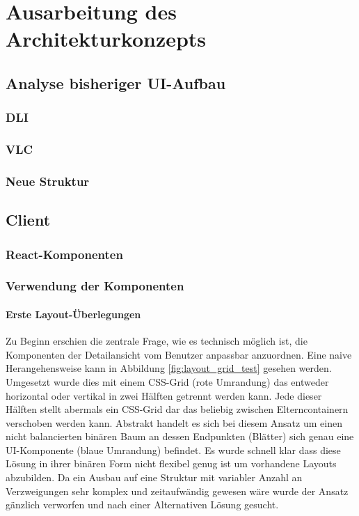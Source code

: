 \chapter{Ausarbeitung des Architekturkonzepts}\label{chap:concept}
\section{Analyse bisheriger UI-Aufbau}


\subsection{DLI}
\subsection{VLC}
\subsection{Neue Struktur}

\section{Client}
\subsection{React-Komponenten}

\subsection{Verwendung der Komponenten}
\subsubsection{Erste Layout-Überlegungen}
Zu Beginn erschien die zentrale Frage, wie  es technisch möglich ist, die Komponenten der Detailansicht vom Benutzer anpassbar anzuordnen. Eine naive Herangehensweise kann in Abbildung \ref{fig:layout_grid_test} gesehen werden. Umgesetzt wurde dies mit einem CSS-Grid (rote Umrandung) das entweder horizontal oder vertikal in zwei Hälften getrennt werden kann. Jede dieser Hälften stellt abermals ein CSS-Grid dar das beliebig zwischen Elterncontainern verschoben werden kann. Abstrakt handelt es sich bei diesem Ansatz um einen nicht balancierten binären Baum an dessen Endpunkten (Blätter) sich genau eine UI-Komponente (blaue Umrandung) befindet. Es wurde schnell klar dass diese Lösung in ihrer binären Form nicht flexibel genug ist um vorhandene Layouts abzubilden. Da ein Ausbau auf eine Struktur mit variabler Anzahl an Verzweigungen sehr komplex und zeitaufwändig gewesen wäre wurde der Ansatz gänzlich verworfen und nach einer Alternativen Lösung gesucht. 


